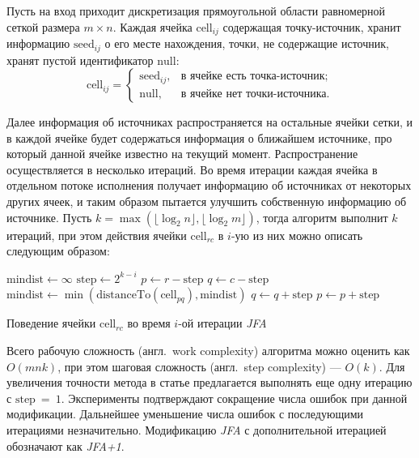\documentclass[12pt]{article}
\begin{document}
Пусть на вход приходит дискретизация прямоугольной области 
равномерной сеткой размера $m \times n$. Каждая ячейка $\mathrm{cell}_{ij}$ 
содержащая точку-источник, хранит информацию $\mathrm{seed}_{ij}$ о его месте нахождения,
точки, не содержащие источник, хранят пустой идентификатор ${\mathrm{null}}$:
$$
	\mathrm{cell}_{ij} = \left\lbrace
	\begin{array}{ll}
	\mathrm{seed}_{ij}, & \mbox{в ячейке есть точка-источник;} \\
	\mathrm{null}, & \mbox{в ячейке нет точки-источника.}
	\end{array}
	\right.
$$

Далее информация об источниках распространяется на остальные ячейки
сетки, и в каждой ячейке будет содержаться информация 
о ближайшем источнике, про который данной ячейке известно на текущий момент. 
Распространение осуществляется в несколько итераций. Во время итерации 
каждая ячейка в отдельном потоке исполнения получает информацию об 
источниках от некоторых других ячеек, и таким образом пытается улучшить
собственную информацию об источнике. Пусть  $k = \max(\lfloor\log_2n\rfloor, \lfloor\log_2m\rfloor)$, 
тогда алгоритм выполнит $k$ итераций, при этом действия ячейки $\mathrm{cell}_{rc}$ 
в $i$-ую из них можно описать следующим образом:

\begin{algorithm}
\begin{algorithmic}
\State $\mathrm{mindist} \leftarrow \infty$
\State $\mathrm{step} \gets 2^{k - i}$
\State $p \gets r - \mathrm{step}$
	\State $q \gets c - \mathrm{step}$
			\State $\mathrm{mindist} \gets 
 					\min(\mathrm{distanceTo}(\mathrm{cell}_{pq}), \mathrm{mindist})$
		\EndIf
		\State $q \gets q + \mathrm{step}$
 	\EndWhile
\State $p \gets p + \mathrm{step}$
\EndWhile
\end{algorithmic}
\caption{Поведение ячейки $\mathrm{cell}_{rc}$ во время $i$-ой итерации
\emph{JFA}}
\label{jfa_algo}
\end{algorithm}

Всего рабочую сложность (англ.~work complexity) алгоритма можно оценить 
как $O(m n k)$, при этом шаговая сложность (англ.~step complexity) --- $O(k)$. 
Для увеличения точности метода в статье предлагается выполнять 
еще одну итерацию с $\mathrm{step}~=~1$. Эксперименты подтверждают 
сокращение числа ошибок при данной модификации. Дальнейшее уменьшение числа 
ошибок с последующими итерациями незначительно. 
Модификацию \emph{JFA} с дополнительной итерацией обозначают как \emph{JFA+1}.
\end{document}
